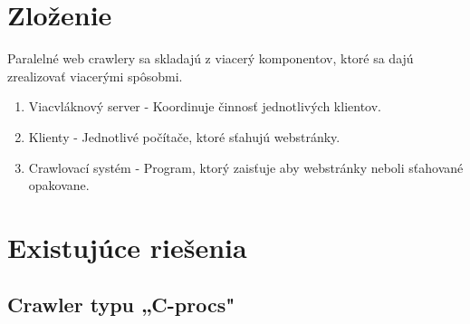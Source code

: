 \documentclass[10pt,twoside,slovak,a4paper]{article}
\begin{document}
\section{Zloženie}

Paralelné web crawlery sa skladajú z viacerý komponentov, ktoré sa dajú zrealizovať viacerými spôsobmi. \cite{9645918} \cite{kausar2013web} %

\begin{enumerate}
	\item Viacvláknový server - Koordinuje činnosť jednotlivých klientov.
	\item Klienty - Jednotlivé počítače, ktoré sťahujú webstránky.
	\item Crawlovací systém - Program, ktorý zaisťuje aby webstránky neboli sťahované opakovane.
\end{enumerate}

\section{Existujúce riešenia}
	\subsection{Crawler typu „C-procs" \cite{sharma2011novel}} %

\newpage

\nocite{*}


\end{document}
